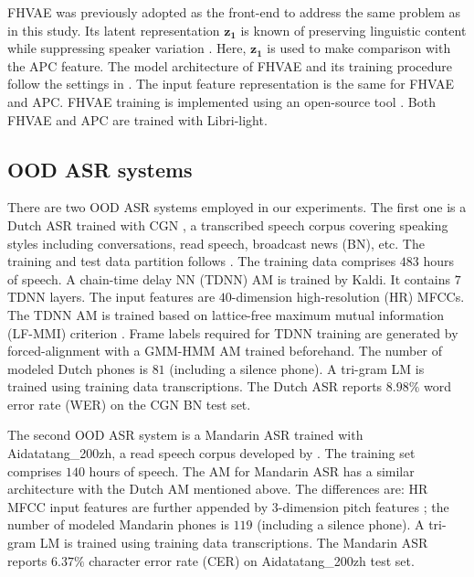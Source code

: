 \documentclass[a4paper]{article}
\begin{document}
FHVAE was previously adopted \cite{Feng2019improving} as the front-end to address the same problem as in this study. Its latent representation $\bm{z_1}$ is known of preserving linguistic content while suppressing speaker variation \cite{hsu2017nips}. Here, $\bm{z_1}$ is used to make comparison with the APC feature. The model architecture of FHVAE and its training procedure follow the settings in \cite{Feng2019improving}.
The input feature representation is the same for FHVAE and  APC. FHVAE training is implemented using an open-source tool \cite{hsu2017nips}. Both FHVAE and APC are trained with Libri-light. 
\subsection{OOD ASR systems}
There are two OOD ASR systems employed in our experiments. The first one is a Dutch ASR trained with CGN \cite{oostdijk2000spoken}, a transcribed speech corpus covering  speaking styles including conversations, read speech, broadcast news (BN), etc.
The training and test data partition follows \cite{laurensw75cgn_kaldi}. The training data comprises $483$
 hours of speech. A chain-time delay NN (TDNN) AM \cite{povey2016purely} is trained by Kaldi. It contains $7$ TDNN layers. The input features are $40$-dimension high-resolution (HR) MFCCs. 
 The TDNN AM is trained based on lattice-free maximum mutual information (LF-MMI) criterion \cite{povey2016purely}. Frame labels required for TDNN training are generated by forced-alignment with a GMM-HMM AM trained beforehand. The number of modeled Dutch phones is $81$ (including a silence phone).
 A tri-gram LM is trained using training data transcriptions. 
The Dutch ASR reports $8.98\%$ word error rate (WER) on the CGN BN test set.

The second OOD ASR system is a Mandarin ASR trained with Aidatatang\_200zh, a read speech corpus developed by \cite{aidatatang}. The training set comprises $140$ hours of speech. 
The AM for Mandarin ASR has a similar architecture with the Dutch AM mentioned above. The differences are: HR MFCC input  features are further appended by $3$-dimension pitch features \cite{ghahremani2014pitch}; the number of modeled Mandarin phones is $119$ (including a silence phone). 
A tri-gram LM is trained using training data transcriptions.
The Mandarin ASR reports $6.37\%$ character error rate (CER) on Aidatatang\_200zh test set.
\end{document}
